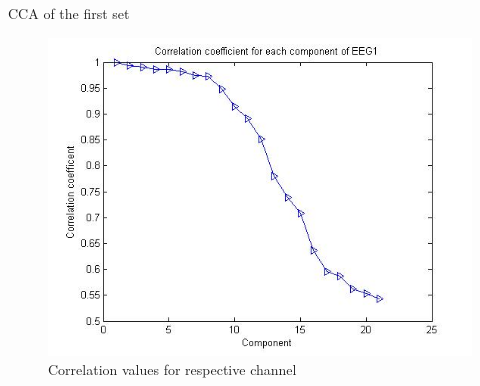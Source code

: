 \documentclass[t,12pt,english
\ifx\beamermode\undefined\else,\beamermode\fi
]{beamer}
\begin{document}
\begin{frame}{CCA of the first set}
\begin{figure}[!htbp]
\includegraphics[width=1\textwidth]{5.jpg}\\
\tiny{\tiny Correlation values for respective channel}
\endminipage\hfill
\end{figure}
    
\end{frame} 
      
\end{document}
